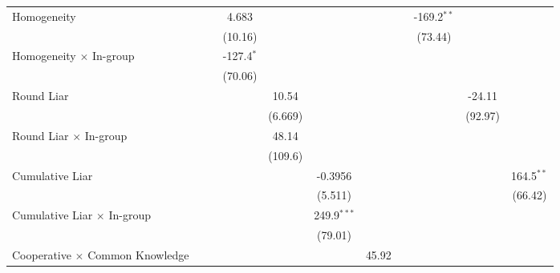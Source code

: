 \begin{tabular}{lcccccccccc}
   Homogeneity                                &          &             & 4.683        &          &               &          &          & -169.2$^{**}$ &          &   \\   
                                              &          &             & (10.16)      &          &               &          &          & (73.44)       &          &   \\   
   Homogeneity $\times$ In-group              &          &             & -127.4$^{*}$ &          &               &          &          &               &          &   \\   
                                              &          &             & (70.06)      &          &               &          &          &               &          &   \\   
   Round Liar                                 &          &             &              & 10.54    &               &          &          &               & -24.11   &   \\   
                                              &          &             &              & (6.669)  &               &          &          &               & (92.97)  &   \\   
   Round Liar $\times$ In-group               &          &             &              & 48.14    &               &          &          &               &          &   \\   
                                              &          &             &              & (109.6)  &               &          &          &               &          &   \\   
   Cumulative Liar                            &          &             &              &          & -0.3956       &          &          &               &          & 164.5$^{**}$\\   
                                              &          &             &              &          & (5.511)       &          &          &               &          & (66.42)\\   
   Cumulative Liar $\times$ In-group          &          &             &              &          & 249.9$^{***}$ &          &          &               &          &   \\   
                                              &          &             &              &          & (79.01)       &          &          &               &          &   \\   
   Cooperative $\times$ Common Knowledge      &          &             &              &          &               & 45.92    &          &               &          &   \\   

\end{tabular}
